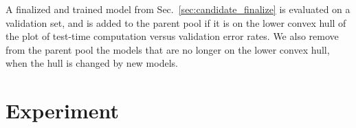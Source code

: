 A finalized and trained model from Sec.~\ref{sec:candidate_finalize} is evaluated on a validation set, and is added to the parent pool if it is on the lower convex hull of the plot of test-time computation versus validation error rates. We also remove from the parent pool the models that are no longer on the lower convex hull, when the hull is changed by new models. 
    
\section{Experiment}







